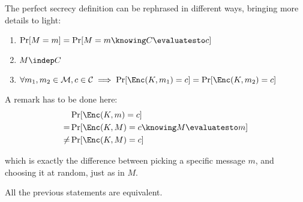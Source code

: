 The perfect secrecy definition can be rephrased in different ways, bringing more details to light:
\begin{enumerate}
    \item $\Pr[M = m] = \Pr[M = m \knowing C \evaluatesto c]$
    \item $M \indep C$
    \item $\forall m_1, m_2 \in \M, c \in \C \implies \Pr[\Enc(K, m_1) = c] = \Pr[\Enc(K, m_2) = c]$
\end{enumerate}

A remark has to be done here:
\begin{align*}
    & \Pr[\Enc(K, m) = c] \\
    =& \Pr[\Enc(K, M) = c \knowing M \evaluatesto m] \\
    \neq& \Pr[\Enc(K, M) = c]
\end{align*}

which is exactly the difference between picking a specific message $m$, and choosing it at random, just as in $M$.
    
\begin{proposition}
    All the previous statements are equivalent.
\end{proposition}

